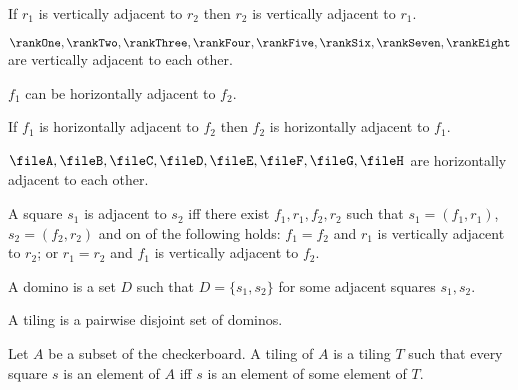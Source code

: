 \begin{axiom}
   If $r_1$ is vertically adjacent to $r_2$ then $r_2$ is vertically adjacent to $r_1$.
\end{axiom}


\begin{axiom}
   $\rankOne, \rankTwo, \rankThree, \rankFour, \rankFive, \rankSix, \rankSeven, \rankEight$
   are vertically adjacent to each other.
\end{axiom}


\begin{signature}
   $f_1$ can be horizontally adjacent to $f_2$.
\end{signature}

\begin{axiom}
   If $f_1$ is horizontally adjacent to $f_2$ then $f_2$ is horizontally adjacent to $f_1$.
\end{axiom}


\begin{axiom}
   $\fileA, \fileB, \fileC, \fileD, \fileE, \fileF, \fileG, \fileH$
   are horizontally adjacent to each other.
\end{axiom}


\begin{definition}
   A square $s_1$ is adjacent to $s_2$ iff
   there exist $f_1, r_1, f_2, r_2$ such that
   $s_1 = (f_1, r_1)$, $s_2 = (f_2, r_2)$ and on of the following holds:
   $f_1 = f_2$ and $r_1$ is vertically adjacent to $r_2$;
   or $r_1 = r_2$ and $f_1$ is vertically adjacent to $f_2$.
\end{definition}



\begin{definition}
   A domino is a set $D$
   such that $D = \{ s_1, s_2 \}$
   for some adjacent squares $s_1, s_2$.
\end{definition}


\begin{definition}
   A tiling is a pairwise disjoint set of dominos.
\end{definition}

\begin{definition}
   Let $A$ be a subset of the checkerboard.
   A tiling of $A$ is a tiling $T$
   such that every square $s$
   is an element of $A$ iff
   $s$ is an element of some element of $T$.
\end{definition}


